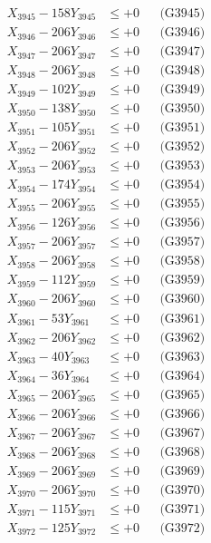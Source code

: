 \documentclass[a4paper,10pt]{article}
\begin{document}
{\begin{align}
X_{3945} - 158Y_{3945} &\leq +0 && \text{(G3945)} \\
X_{3946} - 206Y_{3946} &\leq +0 && \text{(G3946)} \\
X_{3947} - 206Y_{3947} &\leq +0 && \text{(G3947)} \\
X_{3948} - 206Y_{3948} &\leq +0 && \text{(G3948)} \\
X_{3949} - 102Y_{3949} &\leq +0 && \text{(G3949)} \\
X_{3950} - 138Y_{3950} &\leq +0 && \text{(G3950)} \\
\allowbreak
X_{3951} - 105Y_{3951} &\leq +0 && \text{(G3951)} \\
X_{3952} - 206Y_{3952} &\leq +0 && \text{(G3952)} \\
X_{3953} - 206Y_{3953} &\leq +0 && \text{(G3953)} \\
X_{3954} - 174Y_{3954} &\leq +0 && \text{(G3954)} \\
X_{3955} - 206Y_{3955} &\leq +0 && \text{(G3955)} \\
X_{3956} - 126Y_{3956} &\leq +0 && \text{(G3956)} \\
X_{3957} - 206Y_{3957} &\leq +0 && \text{(G3957)} \\
X_{3958} - 206Y_{3958} &\leq +0 && \text{(G3958)} \\
X_{3959} - 112Y_{3959} &\leq +0 && \text{(G3959)} \\
X_{3960} - 206Y_{3960} &\leq +0 && \text{(G3960)} \\
\allowbreak
X_{3961} - 53Y_{3961} &\leq +0 && \text{(G3961)} \\
X_{3962} - 206Y_{3962} &\leq +0 && \text{(G3962)} \\
X_{3963} - 40Y_{3963} &\leq +0 && \text{(G3963)} \\
X_{3964} - 36Y_{3964} &\leq +0 && \text{(G3964)} \\
X_{3965} - 206Y_{3965} &\leq +0 && \text{(G3965)} \\
X_{3966} - 206Y_{3966} &\leq +0 && \text{(G3966)} \\
X_{3967} - 206Y_{3967} &\leq +0 && \text{(G3967)} \\
X_{3968} - 206Y_{3968} &\leq +0 && \text{(G3968)} \\
X_{3969} - 206Y_{3969} &\leq +0 && \text{(G3969)} \\
X_{3970} - 206Y_{3970} &\leq +0 && \text{(G3970)} \\
\allowbreak
X_{3971} - 115Y_{3971} &\leq +0 && \text{(G3971)} \\
X_{3972} - 125Y_{3972} &\leq +0 && \text{(G3972)} \\

\end{align}}
\end{document}
